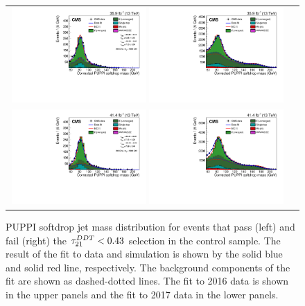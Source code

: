  \begin{figure}[h!]
 \centering
 \begin{tabular}{cc}
 \includegraphics[width=0.49\textwidth]{figures/analysis/search3/AN-17-303/vtag/newddt_2016_pass.pdf}
 \includegraphics[width=0.49\textwidth]{figures/analysis/search3/AN-17-303/vtag/newddt_2016_fail.pdf}\\
 \includegraphics[width=0.49\textwidth]{figures/analysis/search3/AN-17-303/vtag/newddt_TopPtRew_2017_pass.pdf}
 \includegraphics[width=0.49\textwidth]{figures/analysis/search3/AN-17-303/vtag/newddt_TopPtRew_2017_fail.pdf}
 \end{tabular}
 \caption{PUPPI softdrop jet mass distribution for events that pass (left) and fail (right) the $\tau_{21}^{DDT}<0.43$ selection in the \ttbar control sample. The result of the fit to data and simulation is shown by the solid blue and solid red line, respectively. The background components of the fit are shown as dashed-dotted lines. The fit to 2016 data is shown in the upper panels and the fit to 2017 data in the lower panels.}
 \label{fig:simFit}
 \end{figure}
